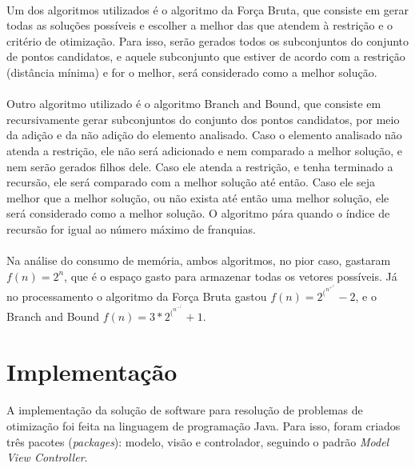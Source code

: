 \documentclass[12pt]{article}
\begin{document}
\paragraph{}Um dos algoritmos utilizados é o algoritmo da Força Bruta, que consiste em gerar todas as soluções possíveis e escolher a melhor das que atendem à restrição e o critério de otimização. Para isso, serão gerados todos os subconjuntos do conjunto de pontos candidatos, e aquele subconjunto que estiver de acordo com a restrição (distância mínima) e for o melhor, será considerado como a melhor solução.

\paragraph{}Outro algoritmo utilizado é o algoritmo Branch and Bound, que consiste em recursivamente gerar subconjuntos do conjunto dos pontos candidatos, por meio da adição e da não adição do elemento analisado. Caso o elemento analisado não atenda a restrição, ele não será adicionado e nem comparado a melhor solução, e nem serão gerados filhos dele. Caso ele atenda a restrição, e tenha terminado a recursão, ele será comparado com a melhor solução até então. Caso ele seja melhor que a melhor solução, ou não exista até então uma melhor solução, ele será considerado como a melhor solução. O algoritmo pára quando o índice de recursão for igual ao número máximo de franquias.

\paragraph{}Na análise do consumo de memória, ambos algoritmos, no pior caso, gastaram 
\(f(n)=2^n\), que é o espaço gasto para armazenar todas os vetores possíveis. Já no processamento o algoritmo da Força Bruta gastou \(f(n)=2^(^n^+^1^)-2\), e o Branch and Bound \(f(n)=3*2^(^n^-^1^)+1\).

\section{Implementação}

\paragraph{}A implementação da solução de software para resolução de problemas de otimização foi feita na linguagem de programação Java. Para isso, foram criados três pacotes (\textit{packages}): modelo, visão e controlador, seguindo o padrão \textit{Model View Controller}.
\end{document}
